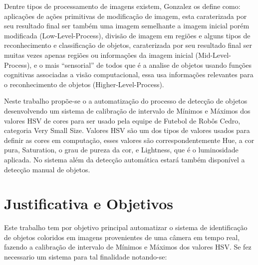 	Dentre tipos de processamento de imagens existem, Gonzalez\cite{Gonzalez:2008} os define como: aplicações de ações primitivas de modificação de imagem, esta caraterizada por seu resultado final ser também uma imagem semelhante a imagem inicial porém modificada (Low-Level-Process), divisão de imagem em regiões e alguns tipos de reconhecimento e classificação de objetos, caraterizada por seu resultado final ser muitas vezes apenas regiões ou informações da imagem inicial (Mid-Level-Process), e o mais “sensorial” de todos que é a analise de objetos usando funções cognitivas associadas a visão computacional, essa usa informações relevantes para o reconhecimento de objetos (Higher-Level-Process).     
%
 
	Neste trabalho propõe-se o a automatização do processo de detecção de objetos desenvolvendo um sistema de calibração de intervalo de Mínimos e Máximos dos valores HSV de cores para ser usado pela equipe de Futebol de Robôs Cedro, categoria Very Small Size. Valores HSV são um dos tipos de valores usados para definir as cores em computação, esses valores são correspondentemente Hue, a cor pura, Saturation, o grau de pureza da cor, e Lightness, que é o luminosidade aplicada. No sistema além da detecção automática estará também disponível a detecção manual de objetos. 


\section{Justificativa e Objetivos}

Este trabalho tem por objetivo principal automatizar o sistema de identificação de objetos 
coloridos em imagens provenientes de uma câmera  em tempo real, fazendo a calibração de intervalo de Mínimos e Máximos dos valores HSV.  
Se fez necessario um sistema para tal finalidade notando-se:

